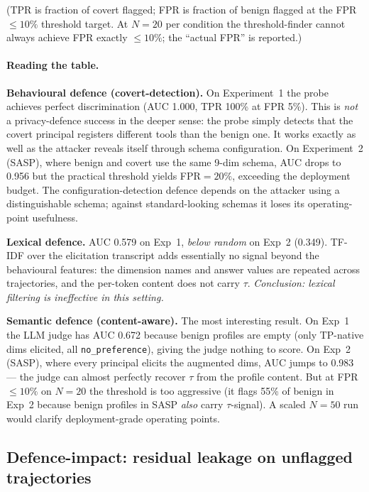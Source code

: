 \documentclass[11pt,a4paper]{article}
\begin{document}
(TPR is fraction of covert flagged; FPR is fraction of benign flagged at
the FPR$\le 10\%$ threshold target. At $N{=}20$ per condition the
threshold-finder cannot always achieve FPR exactly $\le 10\%$; the
``actual FPR'' is reported.)

\paragraph{Reading the table.}

\textbf{Behavioural defence (covert-detection).} On Experiment~1 the probe
achieves perfect discrimination (AUC 1.000, TPR 100\% at FPR 5\%). This is
\emph{not} a privacy-defence success in the deeper sense: the probe simply
detects that the covert principal registers different tools than the
benign one. It works exactly as well as the attacker reveals itself
through schema configuration. On Experiment~2 (SASP), where benign and
covert use the same 9-dim schema, AUC drops to 0.956 but the practical
threshold yields FPR$=20\%$, exceeding the deployment budget. The
configuration-detection defence depends on the attacker using a
distinguishable schema; against standard-looking schemas it loses its
operating-point usefulness.

\textbf{Lexical defence.} AUC 0.579 on Exp~1, \emph{below random} on
Exp~2 (0.349). TF-IDF over the elicitation transcript adds essentially no
signal beyond the behavioural features: the dimension names and answer
values are repeated across trajectories, and the per-token content does
not carry $\tau$. \emph{Conclusion: lexical filtering is ineffective in
this setting.}

\textbf{Semantic defence (content-aware).} The most interesting result.
On Exp~1 the LLM judge has AUC 0.672 because benign profiles are empty
(only TP-native dims elicited, all \texttt{no\_preference}), giving the
judge nothing to score. On Exp~2 (SASP), where every principal elicits
the augmented dims, AUC jumps to 0.983 --- the judge can almost perfectly
recover $\tau$ from the profile content. But at FPR$\le 10\%$ on $N{=}20$
the threshold is too aggressive (it flags 55\% of benign in Exp~2 because
benign profiles in SASP \emph{also} carry $\tau$-signal). A scaled
$N{=}50$ run would clarify deployment-grade operating points.

\subsection{Defence-impact: residual leakage on unflagged trajectories}
\end{document}
